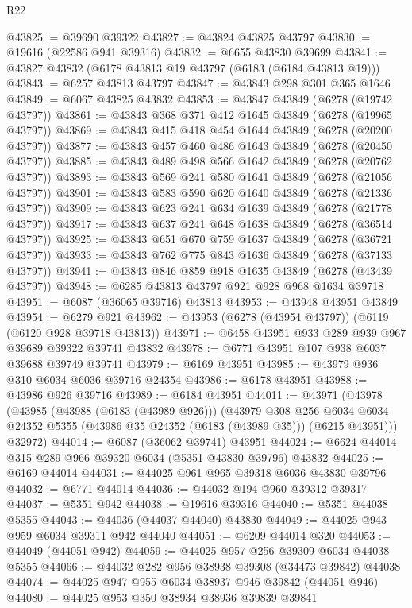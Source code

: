 \begin{lexlean}{R22}
\begin{coremodule}
@43825 := @39690 @39322
@43827 := @43824 @43825 @43797
@43830 := @19616 (@22586 @941 @39316)
@43832 := @6655 @43830 @39699
@43841 := @43827 @43832 (@6178 @43813 @19 @43797 (@6183 (@6184 @43813 @19)))
@43843 := @6257 @43813 @43797
@43847 := @43843 @298 @301 @365 @1646
@43849 := @6067 @43825 @43832
@43853 := @43847 @43849 (@6278 (@19742 @43797))
@43861 := @43843 @368 @371 @412 @1645 @43849 (@6278 (@19965 @43797))
@43869 := @43843 @415 @418 @454 @1644 @43849 (@6278 (@20200 @43797))
@43877 := @43843 @457 @460 @486 @1643 @43849 (@6278 (@20450 @43797))
@43885 := @43843 @489 @498 @566 @1642 @43849 (@6278 (@20762 @43797))
@43893 := @43843 @569 @241 @580 @1641 @43849 (@6278 (@21056 @43797))
@43901 := @43843 @583 @590 @620 @1640 @43849 (@6278 (@21336 @43797))
@43909 := @43843 @623 @241 @634 @1639 @43849 (@6278 (@21778 @43797))
@43917 := @43843 @637 @241 @648 @1638 @43849 (@6278 (@36514 @43797))
@43925 := @43843 @651 @670 @759 @1637 @43849 (@6278 (@36721 @43797))
@43933 := @43843 @762 @775 @843 @1636 @43849 (@6278 (@37133 @43797))
@43941 := @43843 @846 @859 @918 @1635 @43849 (@6278 (@43439 @43797))
@43948 := @6285 @43813 @43797 @921 @928 @968 @1634 @39718
@43951 := @6087 (@36065 @39716) @43813
@43953 := @43948 @43951 @43849
@43954 := @6279 @921
@43962 := @43953 (@6278 (@43954 @43797)) (@6119 (@6120 @928 @39718 @43813))
@43971 := @6458 @43951 @933 @289 @939 @967 @39689 @39322 @39741 @43832
@43978 := @6771 @43951 @107 @938 @6037 @39688 @39749 @39741
@43979 := @6169 @43951
@43985 := @43979 @936 @310 @6034 @6036 @39716 @24354
@43986 := @6178 @43951
@43988 := @43986 @926 @39716
@43989 := @6184 @43951
@44011 := @43971
    (@43978
      (@43985
        (@43988 (@6183 (@43989 @926)))
        (@43979
          @308
          @256
          @6034
          @6034
          @24352
          @5355
          (@43986 @35 @24352 (@6183 (@43989 @35)))
          (@6215 @43951)))
      @32972)
@44014 := @6087 (@36062 @39741) @43951
@44024 := @6624 @44014 @315 @289 @966 @39320 @6034 (@5351 @43830 @39796) @43832
@44025 := @6169 @44014
@44031 := @44025 @961 @965 @39318 @6036 @43830 @39796
@44032 := @6771 @44014
@44036 := @44032 @194 @960 @39312 @39317
@44037 := @5351 @942
@44038 := @19616 @39316
@44040 := @5351 @44038 @5355
@44043 := @44036 (@44037 @44040) @43830
@44049 := @44025 @943 @959 @6034 @39311 @942 @44040
@44051 := @6209 @44014 @320
@44053 := @44049 (@44051 @942)
@44059 := @44025 @957 @256 @39309 @6034 @44038 @5355
@44066 := @44032 @282 @956 @38938 @39308 (@34473 @39842) @44038
@44074 := @44025 @947 @955 @6034 @38937 @946 @39842 (@44051 @946)
@44080 := @44025 @953 @350 @38934 @38936 @39839 @39841

\end{coremodule}
\end{lexlean}
